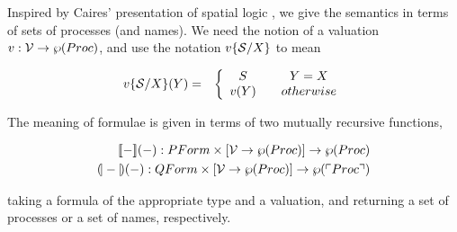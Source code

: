 Inspired by Caires' presentation of spatial logic
\cite{DBLP:conf/fossacs/Caires04}, we give the semantics in terms of
sets of processes (and names). We need the notion of a valuation $v :
\mathbin{\mathcal{V}} \to \wp(\mathbin{Proc})$, and use the notation $v\{ \mathcal{S} / X \}$ to mean 

\begin{eqnarray}
  v\{ \mathcal{S} / X \}(Y) & = &
  \left\{ \begin{array}{ccc}
      S & & Y = X \\
      v(Y) & & otherwise \\
    \end{array}
  \right.\nonumber
\end{eqnarray}

The meaning of formulae is given in terms of two mutually recursive functions,

\begin{eqnarray}
[\![  -  ]\!]( - ) : \mathbin{PForm} \times [\mathbin{\mathcal{V}} \to \wp(\mathbin{Proc})] \to \wp(\mathbin{Proc}) \nonumber\\
(\!|  -  |\!)( - ) : \mathbin{QForm} \times [\mathbin{\mathcal{V}} \to \wp(\mathbin{Proc})] \to \wp(\ulcorner \mathbin{Proc} \urcorner) \nonumber
\end{eqnarray}

taking a formula of the appropriate type and a valuation, and
returning a set of processes or a set of names, respectively.

